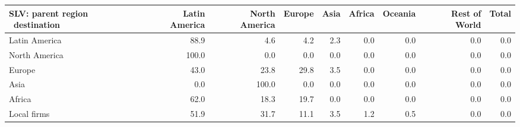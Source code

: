 \begin{tabular}{lrrrrrrrr}
\toprule
SLV: parent region \ destination & Latin America & North America & Europe & Asia & Africa & Oceania & Rest of World & Total \\
\midrule
Latin America & 88.9 & 4.6 & 4.2 & 2.3 & 0.0 & 0.0 & 0.0 & 0.0 \\
North America & 100.0 & 0.0 & 0.0 & 0.0 & 0.0 & 0.0 & 0.0 & 0.0 \\
Europe & 43.0 & 23.8 & 29.8 & 3.5 & 0.0 & 0.0 & 0.0 & 0.0 \\
Asia & 0.0 & 100.0 & 0.0 & 0.0 & 0.0 & 0.0 & 0.0 & 0.0 \\
Africa & 62.0 & 18.3 & 19.7 & 0.0 & 0.0 & 0.0 & 0.0 & 0.0 \\
Local firms & 51.9 & 31.7 & 11.1 & 3.5 & 1.2 & 0.5 & 0.0 & 0.0 \\
\bottomrule
\end{tabular}
